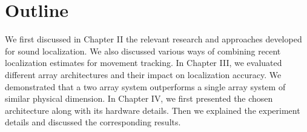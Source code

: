 \section{Outline}
We first discussed in Chapter II the relevant research and approaches developed for sound localization. We also discussed various ways of combining recent localization estimates for movement tracking. In Chapter III, we evaluated different array architectures and their impact on localization accuracy. We demonstrated that a two array system outperforms a single array system of similar physical dimension. In Chapter IV, we first presented the chosen architecture along with its hardware details. Then we explained the experiment details and discussed the corresponding results. 

